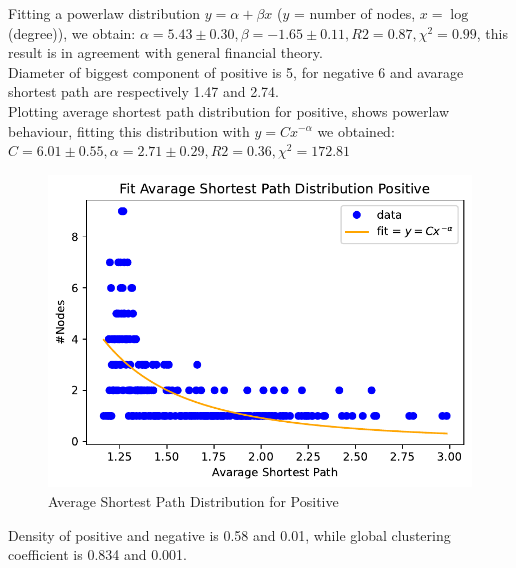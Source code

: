 \documentclass[sigchi]{acmart}
\begin{document}
Fitting a powerlaw distribution $y= \alpha + \beta x$ ($y$ = number of nodes, $x = \log$(degree)), we obtain: $\alpha = 5.43 \pm 0.30, \beta = -1.65 \pm 0.11, R2 = 0.87, \chi^2 = 0.99$, this result is in agreement with general financial theory.\\
Diameter of biggest component of positive is 5, for negative 6 and avarage shortest path are respectively 1.47 and 2.74.\\
Plotting average shortest path distribution for positive, shows powerlaw behaviour, fitting this distribution with $y = Cx^{-\alpha}$ we obtained: $C = 6.01 \pm 0.55, \alpha = 2.71 \pm 0.29, R2 = 0.36, \chi^2 = 172.81$
\begin{figure}[h]
	\centering
	\includegraphics[width=\linewidth]{plot/avarage_shortest_path_distribution_positive_fit.pdf}
	\caption{Average Shortest Path Distribution for Positive }
\end{figure}
Density of positive and negative is 0.58 and 0.01, while global clustering coefficient is 0.834 and 0.001. 
\end{document}
